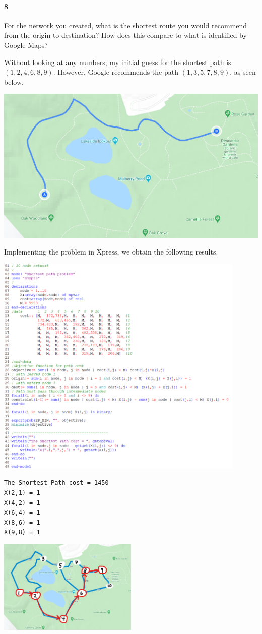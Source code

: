 \documentclass[12pt]{article}
\newenvironment{fullbox}{\begin{lrbox}{\savefullbox}\begin{minipage}{\dimexpr\textwidth-2\fboxsep\relax}}{\end{minipage}\end{lrbox}\begin{center}\framebox[\textwidth]{\usebox{\savefullbox}}\end{center}}
\newenvironment{pbox}[1][]{\begin{fullbox}\ifx#1\empty\else\paragraph{#1}\fi}{\end{fullbox}}
\theoremstyle{definition}
\begin{document}
\newpage
\begin{pbox}[8]
    For the network you created, what is the shortest route you would recommend from the origin to destination? How does this compare to what is identified by Google Maps?
\end{pbox}

Without looking at any numbers, my initial guess for the shortest path is $(1, 2, 4, 6, 8, 9)$. However, Google recommends the path $(1, 3, 5, 7, 8, 9)$, as seen below.

\begin{center}
    \includegraphics[width=\textwidth]{googlesol.png}
\end{center}

Implementing the problem in Xpress, we obtain the following results.

\begin{center}
    \includegraphics[width=0.9\textwidth]{codeg.png}
\end{center}

\begin{verbatim}
The Shortest Path cost = 1450
X(2,1) = 1
X(4,2) = 1
X(6,4) = 1
X(8,6) = 1
X(9,8) = 1
\end{verbatim}

\begin{center}
    \includegraphics[width=0.5\textwidth]{solg.png}
\end{center}
\end{document}
